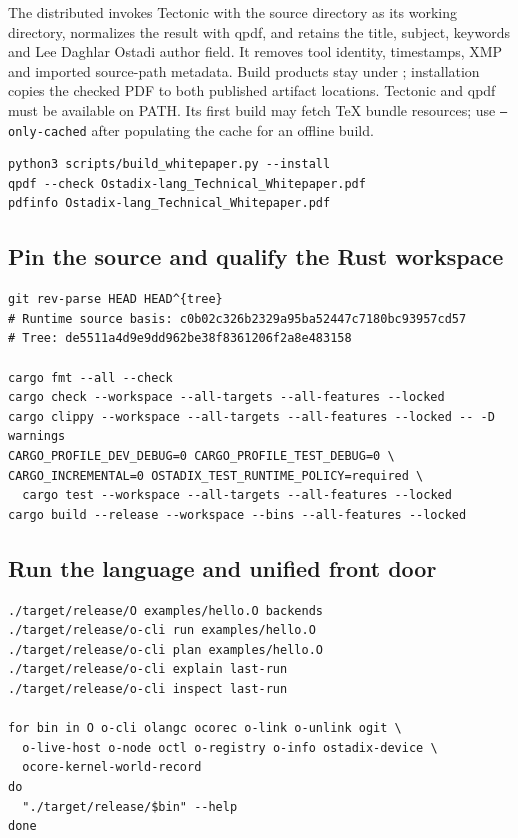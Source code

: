 \documentclass[11pt,oneside]{article}
\begin{document}
The distributed  invokes Tectonic with the
source directory as its working directory, normalizes the result with qpdf,
and retains the title, subject, keywords and Lee Daghlar Ostadi author field.
It removes tool identity, timestamps, XMP and imported source-path metadata.
Build products stay under ; installation copies the
checked PDF to both published artifact locations. Tectonic and qpdf must be
available on PATH. Its first build may fetch TeX bundle resources; use
\texttt{--only-cached} after populating the cache for an offline build.

\begin{lstlisting}[style=plaincode]
python3 scripts/build_whitepaper.py --install
qpdf --check Ostadix-lang_Technical_Whitepaper.pdf
pdfinfo Ostadix-lang_Technical_Whitepaper.pdf
\end{lstlisting}

\subsection{Pin the source and qualify the Rust workspace}

\begin{lstlisting}[style=plaincode]
git rev-parse HEAD HEAD^{tree}
# Runtime source basis: c0b02c326b2329a95ba52447c7180bc93957cd57
# Tree: de5511a4d9e9dd962be38f8361206f2a8e483158

cargo fmt --all --check
cargo check --workspace --all-targets --all-features --locked
cargo clippy --workspace --all-targets --all-features --locked -- -D warnings
CARGO_PROFILE_DEV_DEBUG=0 CARGO_PROFILE_TEST_DEBUG=0 \
CARGO_INCREMENTAL=0 OSTADIX_TEST_RUNTIME_POLICY=required \
  cargo test --workspace --all-targets --all-features --locked
cargo build --release --workspace --bins --all-features --locked
\end{lstlisting}

\subsection{Run the language and unified front door}

\begin{lstlisting}[style=plaincode]
./target/release/O examples/hello.O backends
./target/release/o-cli run examples/hello.O
./target/release/o-cli plan examples/hello.O
./target/release/o-cli explain last-run
./target/release/o-cli inspect last-run

for bin in O o-cli olangc ocorec o-link o-unlink ogit \
  o-live-host o-node octl o-registry o-info ostadix-device \
  ocore-kernel-world-record
do
  "./target/release/$bin" --help
done
\end{lstlisting}
\end{document}
